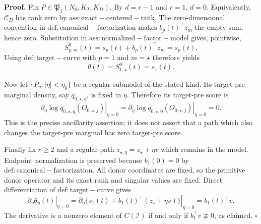 \textbf{Proof.}
Fix \(P\in\mathfrak P_1(N_0,K_T,K_D)\).  By \(d=r-1\) and \(r=1\), \(d=0\).  Equivalently, \(\mathcal C_D\) has rank zero by \(\mathrm{ass:exact-centered-rank}\).  The zero-dimensional convention in \(\mathrm{def:canonical-factorization}\) makes \(b_p(t)^\top z_m\) the empty sum, hence zero.  Substitution in \(\mathrm{ass:normalized-factor-model}\) gives, pointwise,
\[
 S^0_{p,m}(t)=s_p(t)+b_p(t)^\top z_m=s_p(t).
\]
Using \(\mathrm{def:target-curve}\) with \(p=1\) and \(m=\star\) therefore yields
\[
 \theta(t)=S^0_{1,\star}(t)=s_1(t).
\]

Now let \(\{P_\eta:|\eta|<\eta_0\}\) be a regular submodel of the stated kind.  Its target-pre marginal density, say \(q_{0,\star,\eta}\), is fixed in \(\eta\).  Therefore its target-pre score is
\[
 \left.\partial_\eta\log q_{0,\star,\eta}(O_{0,\star,j})\right|_{\eta=0}
 =\left.\partial_\eta\log q_{0,\star,0}(O_{0,\star,j})\right|_{\eta=0}=0.
\]
This is the precise ancillarity assertion; it does not assert that a path which also changes the target-pre marginal has zero target-pre score.

Finally fix \(r\ge2\) and a regular path \(z_{\star,\eta}=z_\star+\eta v\) which remains in the model.  Endpoint normalization is preserved because \(b_1(0)=0\) by \(\mathrm{def:canonical-factorization}\).  All donor coordinates are fixed, so the primitive donor operator and its exact rank and singular values are fixed.  Direct differentiation of \(\mathrm{def:target-curve}\) gives
\[
 \left.\partial_\eta\theta_\eta(t)\right|_{\eta=0}
 =\left.\partial_\eta\{s_1(t)+b_1(t)^\top(z_\star+\eta v)\}\right|_{\eta=0}
 =b_1(t)^\top v.
\]
The derivative is a nonzero element of \(C(\mathcal I)\) if and only if \(b_1^\top v\not\equiv0\), as claimed. \(\square\)